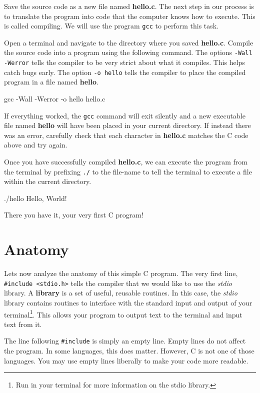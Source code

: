 \documentclass[12pt]{article}
\newcommand{\file}[1]{{\bf\ttfamily #1}}
\newcommand{\ident}[1]{{\it\ttfamily #1}}
\begin{document}
Save the source code as a new file named \file{hello.c}. The next step in our
process is to translate the program into code that the computer knows how to
execute. This is called compiling. We will use the program \verb|gcc| to
perform this task.

Open a terminal and navigate to the directory where you saved \file{hello.c}.
Compile the source code into a program using the following command. The options
\verb|-Wall -Werror| tells the compiler to be very strict about what it
compiles. This helps catch bugs early. The option \verb|-o hello| tells the
compiler to place the compiled program in a file named \file{hello}.

\begin{Terminal}
gcc -Wall -Werror -o hello hello.c
\end{Terminal}

If everything worked, the \verb|gcc| command will exit silently and a new
executable file named \file{hello} will have been placed in your current
directory. If instead there was an error, carefully check that each character in
\file{hello.c} matches the C code above and try again.

Once you have successfully compiled \file{hello.c}, we can execute the program
from the terminal by prefixing \verb|./| to the file-name to tell the terminal
to execute a file within the current directory.

\begin{Terminal}
./hello
Hello, World!
\end{Terminal}

There you have it, your very first C program!

\section{Anatomy}

Lets now analyze the anatomy of this simple C program. The very first line,
\verb|#include <stdio.h>| tells the compiler that we would like to use the
\ident{stdio} library. A \textbf{library} is a set of useful, reusable
routines. In this case, the \ident{stdio} library contains routines to
interface with the standard input and output of your terminal\footnote{Run
 \rmfamily in your terminal for more information on the
stdio library.}.  This allows your program to output text to the terminal and
input text from it.

The line following \verb|#include| is simply an empty line. Empty lines do
not affect the program. In some languages, this does matter. However, C is not
one of those languages. You may use empty lines liberally to make your code
more readable.
\end{document}
